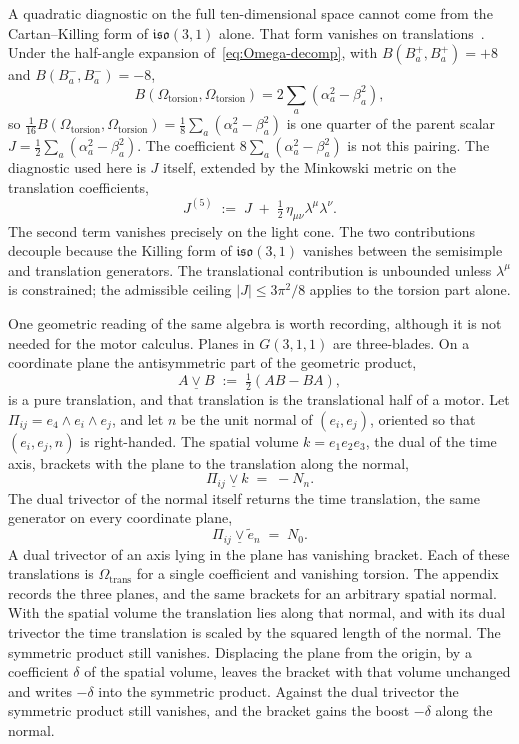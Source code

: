 \documentclass[a4paper]{article}
\begin{document}
A quadratic diagnostic on the full ten-dimensional space cannot come from the Cartan--Killing form of \(\mathfrak{iso}(3,1)\) alone. That form vanishes on translations~\cite{FultonHarris1991,Humphreys1972}. Under the half-angle expansion of~\eqref{eq:Omega-decomp}, with \(B(B_{a}^{+},B_{a}^{+})=+8\) and \(B(B_{a}^{-},B_{a}^{-})=-8\),
\[
B(\Omega_{\mathrm{torsion}},\Omega_{\mathrm{torsion}})=2\sum_{a}(\alpha_{a}^{2}-\beta_{a}^{2}),
\]
so \(\tfrac1{16}B(\Omega_{\mathrm{torsion}},\Omega_{\mathrm{torsion}})=\tfrac18\sum_{a}(\alpha_{a}^{2}-\beta_{a}^{2})\) is one quarter of the parent scalar \(J=\tfrac12\sum_{a}(\alpha_{a}^{2}-\beta_{a}^{2})\). The coefficient \(8\sum_{a}(\alpha_{a}^{2}-\beta_{a}^{2})\) is not this pairing. The diagnostic used here is \(J\) itself, extended by the Minkowski metric on the translation coefficients,
\begin{equation}
J^{(5)}
\;:=\;
J
\;+\;
\tfrac{1}{2}\,\eta_{\mu\nu}\lambda^{\mu}\lambda^{\nu}.
\label{eq:J5-invariant}
\end{equation}
The second term vanishes precisely on the light cone. The two contributions decouple because the Killing form of \(\mathfrak{iso}(3,1)\) vanishes between the semisimple and translation generators. The translational contribution is unbounded unless \(\lambda^{\mu}\) is constrained; the admissible ceiling \(|J|\le 3\pi^{2}/8\) applies to the torsion part alone.

One geometric reading of the same algebra is worth recording, although it is not needed for the motor calculus. Planes in \(G(3,1,1)\) are three-blades. On a coordinate plane the antisymmetric part of the geometric product,
\[
A \mathbin{\underline{\vee}} B \;:=\; \tfrac12(AB-BA),
\]
is a pure translation, and that translation is the translational half of a motor. Let \(\Pi_{ij}=e_{4}\wedge e_{i}\wedge e_{j}\), and let \(n\) be the unit normal of \((e_{i},e_{j})\), oriented so that \((e_{i},e_{j},n)\) is right-handed. The spatial volume \(k=e_{1}e_{2}e_{3}\), the dual of the time axis, brackets with the plane to the translation along the normal,
\[
\Pi_{ij}\mathbin{\underline{\vee}} k \;=\; -N_{n}.
\]
The dual trivector of the normal itself returns the time translation, the same generator on every coordinate plane,
\[
\Pi_{ij}\mathbin{\underline{\vee}}\tilde{e}_{n} \;=\; N_{0}.
\]
A dual trivector of an axis lying in the plane has vanishing bracket. Each of these translations is \(\Omega_{\mathrm{trans}}\) for a single coefficient and vanishing torsion. The appendix records the three planes, and the same brackets for an arbitrary spatial normal. With the spatial volume the translation lies along that normal, and with its dual trivector the time translation is scaled by the squared length of the normal. The symmetric product still vanishes. Displacing the plane from the origin, by a coefficient \(\delta\) of the spatial volume, leaves the bracket with that volume unchanged and writes \(-\delta\) into the symmetric product. Against the dual trivector the symmetric product still vanishes, and the bracket gains the boost \(-\delta\) along the normal.
\end{document}
